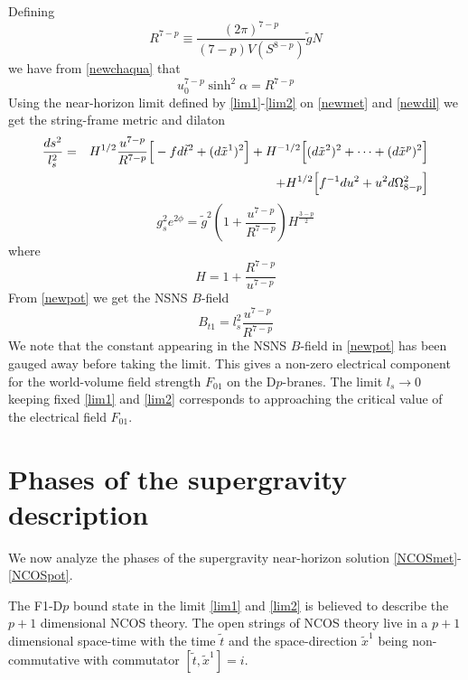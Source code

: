 \documentclass[a4paper,twoside,titlepage,12pt]{article}
\begin{document}
Defining
%
\begin{equation}
R^{7-p} \equiv  \frac{(2\pi)^{7-p}}{(7-p) V( S^{8-p} )} \tilde{g} N
\end{equation}
%
we have from \eqref{newchaqua} that
%
\begin{equation}
u_0^{7-p} \sinh^2 \alpha = R^{7-p}
\end{equation}
%
Using the near-horizon limit defined by \eqref{lim1}-\eqref{lim2}
on \eqref{newmet} and \eqref{newdil} we get the string-frame metric and dilaton
%
\begin{eqnarray}
\label{NCOSmet}
\frac{ds^2}{l_s^2} &=& H^{1/2} \frac{u^{7-p}}{R^{7-p}} 
\Big[ - f d\tilde{t}^2 + (d\tilde{x}^1)^2 \Big] 
+ H^{-1/2} \Big[ (d\tilde{x}^2)^2 + \cdots + (d\tilde{x}^p)^2 \Big]
\nonumber \\ &&
+ H^{1/2} \Big[ f^{-1} du^2 + u^2 d\Omega_{8-p}^2 \Big]
\end{eqnarray}
%
\begin{equation}
\label{NCOSdil}
g_s^2 e^{2\phi} 
= \tilde{g}^2 \left( 1 + \frac{u^{7-p}}{R^{7-p}} \right) H^{\frac{3-p}{2}}
\end{equation}
%
where
%
\begin{equation}
H = 1 + \frac{R^{7-p}}{u^{7-p}}
\end{equation}
%
From \eqref{newpot} we get the NSNS $B$-field 
%
\begin{equation}
\label{NCOSpot}
B_{t1} = l_s^2 \frac{u^{7-p}}{R^{7-p}}
\end{equation}
%
We note that the constant appearing in the NSNS $B$-field in \eqref{newpot}
has been gauged away before taking the limit.
This gives a non-zero electrical component
for the world-volume field strength $F_{01}$ on the D$p$-branes.
The limit $l_s \rightarrow 0$ keeping fixed 
\eqref{lim1} and \eqref{lim2} corresponds to
approaching the critical value of the electrical field $F_{01}$.


\section{Phases of the supergravity description}
\label{secphases}

We now analyze the phases of the supergravity near-horizon solution
\eqref{NCOSmet}-\eqref{NCOSpot}.

The F1-D$p$ bound state in the limit \eqref{lim1} and \eqref{lim2} 
is believed
to describe the $p+1$ dimensional NCOS theory. 
The open strings of NCOS theory live in a $p+1$ dimensional space-time with the
time $\tilde{t}$ and the space-direction $\tilde{x}^1$ being 
non-commutative\cite{Seiberg:2000ms,Gopakumar:2000na} 
with commutator $[\tilde{t},\tilde{x}^1]=i$. 
\end{document}
